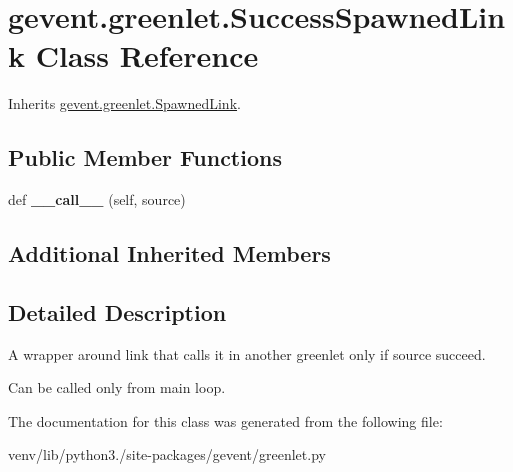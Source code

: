 \hypertarget{classgevent_1_1greenlet_1_1_success_spawned_link}{}\section{gevent.\+greenlet.\+Success\+Spawned\+Link Class Reference}
\label{classgevent_1_1greenlet_1_1_success_spawned_link}


Inherits \hyperlink{classgevent_1_1greenlet_1_1_spawned_link}{gevent.\+greenlet.\+Spawned\+Link}.

\subsection*{Public Member Functions}
\begin{DoxyCompactItemize}
\item 
\mbox{\label{classgevent_1_1greenlet_1_1_success_spawned_link_a5c431af2d502425df1c75c70a75f6e15}} 
def {\bfseries \+\_\+\+\_\+call\+\_\+\+\_\+} (self, source)
\end{DoxyCompactItemize}
\subsection*{Additional Inherited Members}


\subsection{Detailed Description}
\begin{DoxyVerb}A wrapper around link that calls it in another greenlet only if source succeed.

Can be called only from main loop.
\end{DoxyVerb}
 

The documentation for this class was generated from the following file\+:\begin{DoxyCompactItemize}
\item 
venv/lib/python3./site-\/packages/gevent/greenlet.\+py\end{DoxyCompactItemize}

